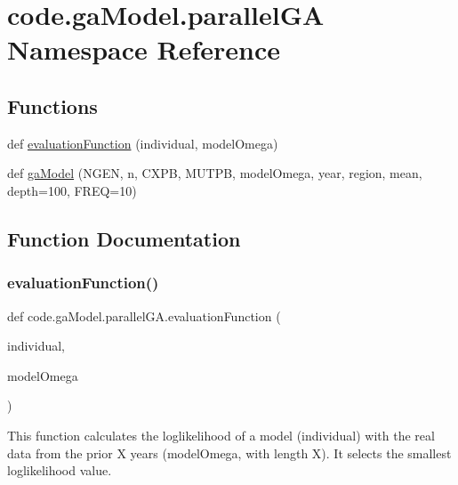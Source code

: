 \hypertarget{namespacecode_1_1ga_model_1_1parallel_g_a}{}\section{code.\+ga\+Model.\+parallel\+GA Namespace Reference}
\label{namespacecode_1_1ga_model_1_1parallel_g_a}
\subsection*{Functions}
\begin{DoxyCompactItemize}
\item 
def \hyperlink{namespacecode_1_1ga_model_1_1parallel_g_a_aa9d1048007f567adaa88457299a1069e}{evaluation\+Function} (individual, model\+Omega)
\item 
def \hyperlink{namespacecode_1_1ga_model_1_1parallel_g_a_a703bc172bcc6b29b3e7d5853daaf547c}{ga\+Model} (N\+G\+EN, n, C\+X\+PB, M\+U\+T\+PB, model\+Omega, year, region, mean, depth=100, F\+R\+EQ=10)
\end{DoxyCompactItemize}


\subsection{Function Documentation}
\mbox{\label{namespacecode_1_1ga_model_1_1parallel_g_a_aa9d1048007f567adaa88457299a1069e}} 
\subsubsection{\texorpdfstring{evaluation\+Function()}{evaluationFunction()}}
{\footnotesize\ttfamily def code.\+ga\+Model.\+parallel\+G\+A.\+evaluation\+Function (\begin{DoxyParamCaption}\item[{}]{individual,  }\item[{}]{model\+Omega }\end{DoxyParamCaption})}

\begin{DoxyVerb}This function calculates the loglikelihood of a model (individual) with 
the real data from the prior X years (modelOmega, with length X).
It selects the smallest loglikelihood value.
\end{DoxyVerb}
 

